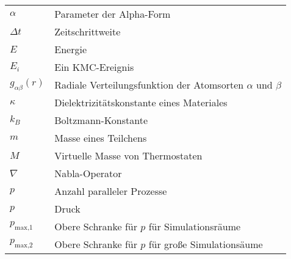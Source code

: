 \begin{longtable}{ll}
$\alpha$             & Parameter der Alpha-Form                                            \\
$\Delta t$           & Zeitschrittweite                                                    \\
$E$                  & Energie                                                             \\
$E_i$                & Ein KMC-Ereignis                                                    \\
$g_{\alpha\beta}(r)$ & Radiale Verteilungsfunktion der Atomsorten $\alpha$ und $\beta$     \\
$\kappa$             & Dielektrizitätskonstante eines Materiales                           \\
$k_B$                & Boltzmann-Konstante                                                 \\
$m$                  & Masse eines Teilchens                                               \\
$M$                  & Virtuelle Masse von Thermostaten                                    \\
$\nabla$             & Nabla-Operator                                                      \\
$p$                  & Anzahl paralleler Prozesse                                          \\
$p$                  & Druck                                                               \\
$p_\text{max,1}$     & Obere Schranke für $p$ für Simulationsräume                         \\
$p_\text{max,2}$     & Obere Schranke für $p$ für große Simulationsäume                    \\

\end{longtable}

